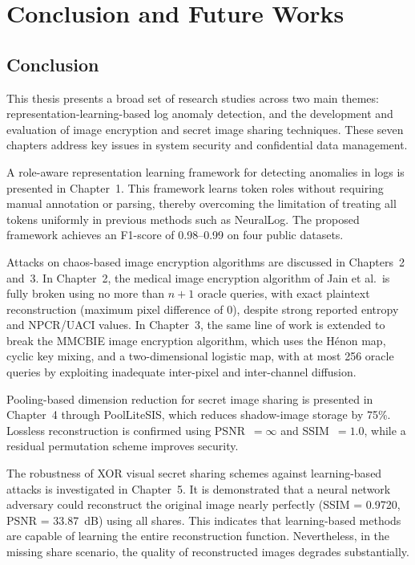 \chapter{Conclusion and Future Works}

\section{Conclusion}

This thesis presents a broad set of research studies across two main themes: representation-learning-based log anomaly detection, and the development and evaluation of image encryption and secret image sharing techniques. These seven chapters address key issues in system security and confidential data management.

A role-aware representation learning framework for detecting anomalies in logs is presented in Chapter~1. This framework learns token roles without requiring manual annotation or parsing, thereby overcoming the limitation of treating all tokens uniformly in previous methods such as NeuralLog. The proposed framework achieves an F1-score of 0.98--0.99 on four public datasets.

Attacks on chaos-based image encryption algorithms are discussed in Chapters~2 and~3. In Chapter~2, the medical image encryption algorithm of Jain et al.\ is fully broken using no more than $n+1$ oracle queries, with exact plaintext reconstruction (maximum pixel difference of 0), despite strong reported entropy and NPCR/UACI values. In Chapter~3, the same line of work is extended to break the MMCBIE image encryption algorithm, which uses the Hénon map, cyclic key mixing, and a two-dimensional logistic map, with at most 256 oracle queries by exploiting inadequate inter-pixel and inter-channel diffusion.

Pooling-based dimension reduction for secret image sharing is presented in Chapter~4 through PoolLiteSIS, which reduces shadow-image storage by 75\%. Lossless reconstruction is confirmed using PSNR~$=\infty$ and SSIM~$= 1.0$, while a residual permutation scheme improves security.

The robustness of XOR visual secret sharing schemes against learning-based attacks is investigated in Chapter~5. It is demonstrated that a neural network adversary could reconstruct the original image nearly perfectly (SSIM = 0.9720, PSNR = 33.87~dB) using all shares. This indicates that learning-based methods are capable of learning the entire reconstruction function. Nevertheless, in the missing share scenario, the quality of reconstructed images degrades substantially.

